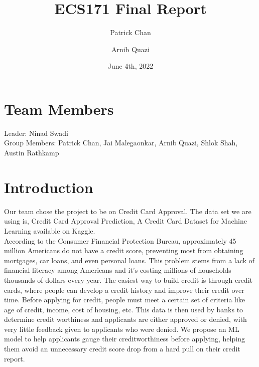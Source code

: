 \documentclass[12pt]{article}
\title{ECS171 Final Report}
\author[1]{Patrick Chan}
\author[2]{Arnib Quazi}
\affil[1]{Email ID: plchan@ucdavis.edu}
\affil[2]{Email ID: arquazi@ucdavis.edu}
\date{June 4th, 2022}
\begin{document}
\maketitle

\newcommand{\CVItemListStart}{\begin{itemize}}
\newcommand{\CVItemListEnd}{\end{itemize}\vspace{-5pt}}
\newcommand{\TimelineStart}{\begin{itemize}}
\newcommand{\TimelineEnd}{\end{itemize}\vspace{-5pt}}

\section{Team Members}
Leader: Ninad Swadi\\
Group Members: Patrick Chan, Jai Malegaonkar, Arnib Quazi, Shlok Shah, Austin Rathkamp\\
 
\section{Introduction}
Our team chose the project to be on Credit Card Approval. The data set we are using is, Credit Card Approval Prediction, A Credit Card Dataset for Machine Learning available on Kaggle.\\

\noindent According to the Consumer Financial Protection Bureau, approximately 45 million Americans do not have a credit score, preventing most from obtaining mortgages, car loans, and even personal loans. This problem stems from a lack of financial literacy among Americans and it’s costing millions of households thousands of dollars every year. The easiest way to build credit is through credit cards, where people can develop a credit history and improve their credit over time. Before applying for credit, people must meet a certain set of criteria like age of credit, income, cost of housing, etc. This data is then used by banks to determine credit worthiness and applicants are either approved or denied, with very little feedback given to applicants who were denied. We propose an ML model to help applicants gauge their creditworthiness before applying, helping them avoid an unnecessary credit score drop from a hard pull on their credit report. \\
\end{document}
